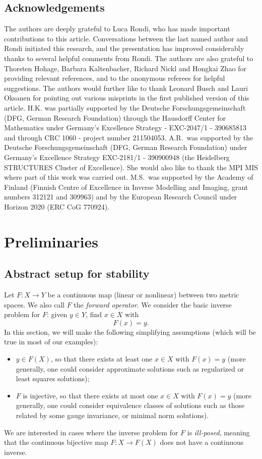 \documentclass[12pt,twoside]{amsart}
\numberwithin{equation}{section}
\begin{document}
\subsection*{Acknowledgements}

The authors are deeply grateful to Luca Rondi, who has made important contributions to this article. Conversations between the last named author and Rondi initiated this research, and the presentation has improved considerably thanks to several helpful comments from Rondi.  The authors are also grateful to Thorsten Hohage, Barbara Kaltenbacher, Richard Nickl and Hongkai Zhao for providing relevant references, and to the anonymous referees for helpful suggestions. The authors would further like to thank Leonard Busch and Lauri Oksanen for pointing out various misprints in the first published version of this article.
H.K. was partially supported by the Deutsche Forschungsgemeinschaft (DFG, German Research Foundation) through the Hausdorff Center for Mathematics under Germany's Excellence Strategy - EXC-2047/1 - 390685813 and through CRC 1060 - project number 211504053. 
A.R.\ was supported by the Deutsche Forschungsgemeinschaft (DFG, German Research Foundation) under Germany's Excellence Strategy EXC-2181/1 - 390900948 (the Heidelberg STRUCTURES Cluster of Excellence). She would also like to thank the MPI MIS where part of this work was carried out.
M.S.\ was supported by the Academy of Finland (Finnish Centre of Excellence in Inverse Modelling and Imaging, grant numbers 312121 and 309963) and by the European Research Council under Horizon 2020 (ERC CoG 770924).




\section{Preliminaries}
\label{sec:pre}

\subsection{Abstract setup for stability}

Let $F: X \to Y$ be a continuous map (linear or nonlinear) between two metric spaces. We also call $F$ the \emph{forward operator}. We consider the basic inverse problem for $F$: given $y \in Y$, find $x \in X$ with 
\[
F(x) = y.
\]
In this section, we will make the following simplifying assumptions (which will be true in most of our examples): 
\begin{itemize}
\item 
$y \in F(X)$, so that there exists at least one $x \in X$ with $F(x) = y$ (more generally, one could consider approximate solutions such as regularized or least squares solutions);
\item 
$F$ is injective, so that there exists at most one $x \in X$ with $F(x) = y$ (more generally, one could consider equivalence classes of solutions such as those related by some gauge invariance, or minimal norm solutions).
\end{itemize}
We are interested in cases where the inverse problem for $F$ is \emph{ill-posed}, meaning that the continuous bijective map $F: X \to F(X)$ does not have a continuous inverse. 
\end{document}
